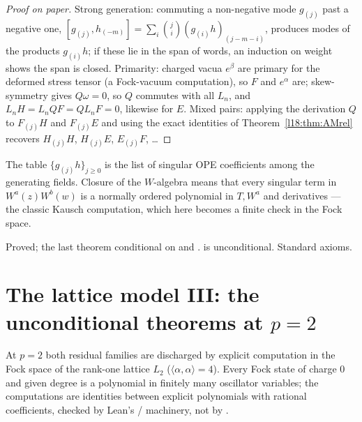 \begin{proof}[Proof on paper]
Strong generation: commuting a non-negative mode $g_{(j)}$ past a negative one,
$[g_{(j)},h_{(-m)}]=\sum_i\binom ji(g_{(i)}h)_{(j-m-i)}$, produces modes of the products $g_{(i)}h$; if
these lie in the span of words, an induction on weight shows the span is closed. Primarity: charged
vacua $e^{\beta}$ are primary for the deformed stress tensor (a Fock-vacuum computation), so $F$ and
$e^\alpha$ are; skew-symmetry gives $Q\omega=0$, so $Q$ commutes with all $L_n$, and $L_nH=L_nQF=QL_nF=0$,
likewise for $E$. Mixed pairs: applying the derivation $Q$ to $F_{(j)}H$ and $F_{(j)}E$ and using the
exact identities of Theorem~\ref{l18:thm:AMrel} recovers $H_{(j)}H$, $H_{(j)}E$, $E_{(j)}F$, \dots
\end{proof}
\begin{physics}
The table $\{g_{(j)}h\}_{j\ge0}$ is the list of singular OPE coefficients among the generating fields.
Closure of the $W$-algebra means that every singular term in $W^a(z)W^b(w)$ is a normally ordered
polynomial in $T,W^a$ and derivatives --- the classic Kausch computation, which here becomes a finite
check in the Fock space.
\end{physics}
\begin{status}
Proved; the last theorem conditional on  and
.  is unconditional. Standard axioms.
\end{status}

\section{The lattice model III: the unconditional theorems at \texorpdfstring{$p=2$}{p=2}}\label{l18:sec:c2two}

At $p=2$ both residual families are discharged by explicit computation in the Fock space of the rank-one
lattice $L_2$ ($\langle\alpha,\alpha\rangle=4$). Every Fock state of charge $0$ and given degree is a polynomial
in finitely many oscillator variables; the computations are identities between explicit polynomials with
rational coefficients, checked by Lean's / machinery, not by .

